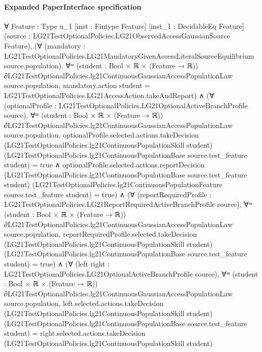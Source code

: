\documentclass[10pt]{article}
\begin{document}
\paragraph{Expanded PaperInterface specification}
\begin{ReviewVerbatim}
∀ {Feature : Type u_1} [inst : Fintype Feature] [inst_1 : DecidableEq Feature]
  (source : LG21TestOptionalPolicies.LG21ObservedAccessGaussianSource Feature),
  (∀ (mandatory : LG21TestOptionalPolicies.LG21MandatoryGivenAccessLiteralSourceEquilibrium source.population),
      ∀ᵐ (student :
        Bool × ℝ × (Feature → ℝ)) ∂LG21TestOptionalPolicies.lg21ContinuousGaussianAccessPopulationLaw source.population,
        mandatory.action student = LG21TestOptionalPolicies.LG21AccessAction.takeAndReport) ∧
    (∀ (optionalProfile : LG21TestOptionalPolicies.LG21OptionalActiveBranchProfile source),
        ∀ᵐ (student :
          Bool ×
            ℝ × (Feature → ℝ)) ∂LG21TestOptionalPolicies.lg21ContinuousGaussianAccessPopulationLaw source.population,
          optionalProfile.selected.actions.takeDecision (LG21TestOptionalPolicies.lg21ContinuousPopulationSkill student)
                (LG21TestOptionalPolicies.lg21ContinuousPopulationBase source.test_feature student) =
              true ∧
            optionalProfile.selected.actions.reportDecision
                (LG21TestOptionalPolicies.lg21ContinuousPopulationBase source.test_feature student)
                (LG21TestOptionalPolicies.lg21ContinuousPopulationFeature source.test_feature student) =
              true) ∧
      (∀ (reportRequiredProfile : LG21TestOptionalPolicies.LG21ReportRequiredActiveBranchProfile source),
          ∀ᵐ (student :
            Bool ×
              ℝ × (Feature → ℝ)) ∂LG21TestOptionalPolicies.lg21ContinuousGaussianAccessPopulationLaw source.population,
            reportRequiredProfile.selected.takeDecision (LG21TestOptionalPolicies.lg21ContinuousPopulationSkill student)
                (LG21TestOptionalPolicies.lg21ContinuousPopulationBase source.test_feature student) =
              true) ∧
        (∀ (left right : LG21TestOptionalPolicies.LG21OptionalActiveBranchProfile source),
            ∀ᵐ (student :
              Bool ×
                ℝ ×
                  (Feature → ℝ)) ∂LG21TestOptionalPolicies.lg21ContinuousGaussianAccessPopulationLaw source.population,
              left.selected.actions.takeDecision (LG21TestOptionalPolicies.lg21ContinuousPopulationSkill student)
                    (LG21TestOptionalPolicies.lg21ContinuousPopulationBase source.test_feature student) =
                  right.selected.actions.takeDecision (LG21TestOptionalPolicies.lg21ContinuousPopulationSkill student)

\end{ReviewVerbatim}
\end{document}
